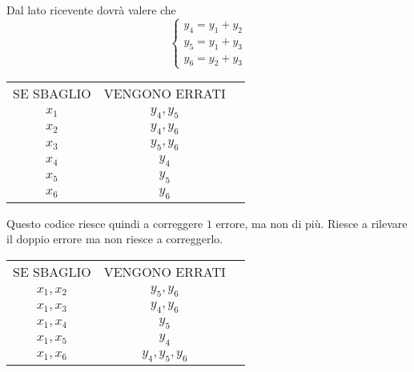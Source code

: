 \documentclass[12pt]{report}
\begin{document}
    \begin{center}
    \end{center}

    \noindent
    Dal lato ricevente  dovrà valere che
    $$\begin{cases} y_4 = y_1 + y_2 \\
    y_5 = y_1 + y_3 \\
    y_6 = y_2 + y_3\end{cases}$$

    \begin{center}
        \begin{tabular}{ccc}
            SE SBAGLIO & VENGONO ERRATI \\
            $x_1$& $y_4,y_5$  \\
            $x_2$& $y_4,y_6$  \\
            $x_3$& $y_5,y_6$  \\
            $x_4$& $y_4$  \\
            $x_5$& $y_5$  \\
            $x_6$& $y_6$  \\
        \end{tabular}
    \end{center}
    Questo codice riesce quindi a correggere $1$ errore, ma non di più. Riesce a rilevare il doppio errore ma non riesce a correggerlo.

    \begin{center}
        \begin{tabular}{ccc}
            SE SBAGLIO & VENGONO ERRATI \\
            $x_1,x_2$& $y_5,y_6$  \\
            $x_1,x_3$& $y_4,y_6$  \\
            $x_1,x_4$& $y_5$  \\
            $x_1,x_5$& $y_4$  \\
            $x_1,x_6$& $y_4,y_5,y_6$
        \end{tabular}
    \end{center}
\end{document}
